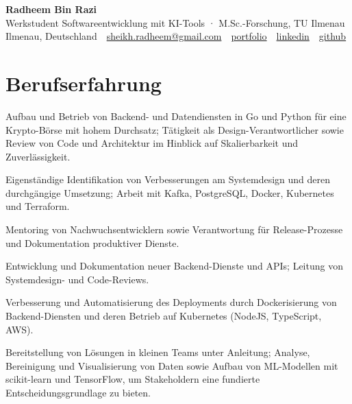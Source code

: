 \documentclass[11pt,a4paper]{resume}
\makeatletter
\newcommand{\Portfolio}{https://radheem.github.io/my-cv}
\newcommand{\PortfolioText}{portfolio}
\newcommand{\GitHub}{https://github.com/radheem}
\newcommand{\LinkedIn}{https://www.linkedin.com/in/radheem-razi}
\newcommand{\Email}{sheikh.radheem@gmail.com}
\makeatother
\begin{document}
\clearpage
{}

\begin{center}
  {\huge\bfseries Radheem Bin Razi}\\[3pt]
  {\large Werkstudent Softwareentwicklung mit KI-Tools · M.Sc.-Forschung, TU Ilmenau}\\[6pt]
  \small
  Ilmenau, Deutschland \,\textbar\,
  \href{mailto:\Email}{\Email} \,\textbar\,
  \href{\Portfolio}{\PortfolioText} \,\textbar\,
  \href{\LinkedIn}{linkedin} \,\textbar\,
  \href{\GitHub}{github}
\end{center}
\vspace{2pt}

\section{Berufserfahrung}

\bullets
  \item Aufbau und Betrieb von Backend- und Datendiensten in Go und Python für eine Krypto-Börse mit hohem Durchsatz; Tätigkeit als Design-Verantwortlicher sowie Review von Code und Architektur im Hinblick auf Skalierbarkeit und Zuverlässigkeit.
  \item Eigenständige Identifikation von Verbesserungen am Systemdesign und deren durchgängige Umsetzung; Arbeit mit Kafka, PostgreSQL, Docker, Kubernetes und Terraform.
  \item Mentoring von Nachwuchsentwicklern sowie Verantwortung für Release-Prozesse und Dokumentation produktiver Dienste.
\bulletsend
\vspace{3pt}
\bullets
  \item Entwicklung und Dokumentation neuer Backend-Dienste und APIs; Leitung von Systemdesign- und Code-Reviews.
  \item Verbesserung und Automatisierung des Deployments durch Dockerisierung von Backend-Diensten und deren Betrieb auf Kubernetes (NodeJS, TypeScript, AWS).
\bulletsend
\vspace{3pt}
\bullets
  \item Bereitstellung von Lösungen in kleinen Teams unter Anleitung; Analyse, Bereinigung und Visualisierung von Daten sowie Aufbau von ML-Modellen mit scikit-learn und TensorFlow, um Stakeholdern eine fundierte Entscheidungsgrundlage zu bieten.
\bulletsend
\vspace{3pt}
\end{document}
